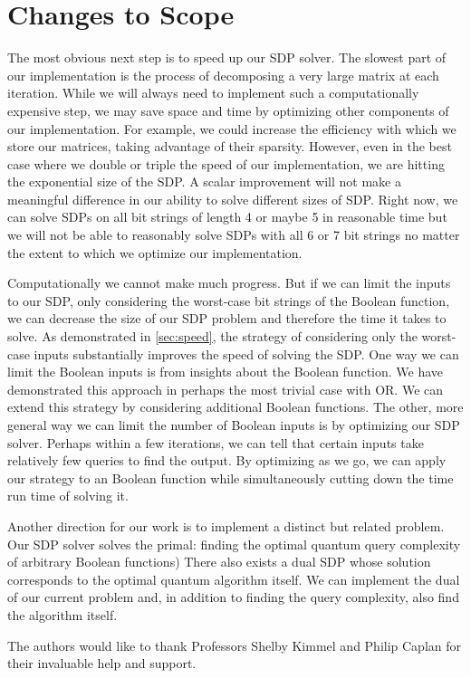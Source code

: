 \section{Changes to Scope}

The most obvious next step is to
speed up our SDP solver.
The slowest part of our implementation is the
process of decomposing a very large matrix at
each iteration.
While we will always need to implement
such a computationally expensive step,
we may save space and time by optimizing other 
components of our implementation.
For example, we could increase the efficiency with
which we store our matrices, taking advantage of
their sparsity. However, even in the best case where
we double or triple the speed of our implementation,
we are hitting the exponential size of the SDP.
A scalar improvement will not make a meaningful
difference in our ability to solve different sizes
of SDP.
Right now, we can solve SDPs on all bit strings
of length 4 or maybe 5 in reasonable time
but we will not be able to reasonably solve
SDPs with all 6 or 7 bit strings no matter the extent
to which we optimize our implementation.

Computationally we cannot make much progress.
But if we can limit the inputs to our SDP,
only considering the worst-case bit strings
of the Boolean function,
we can decrease the size of our SDP problem
and therefore the time it takes to solve.
As demonstrated in \cref{sec:speed}, 
the strategy of considering only the worst-case
inputs substantially improves the speed of solving the SDP.
One way we can limit the Boolean inputs is from
insights about the Boolean function.
We have demonstrated this approach in perhaps the most
trivial case with OR.
We can extend this strategy by considering additional
Boolean functions.
The other, more general way we can limit the number
of Boolean inputs is by optimizing our SDP solver.
Perhaps within a few iterations, we can tell
that certain inputs take relatively few queries to find
the output.
By optimizing as we go, we can apply our strategy to
an Boolean function while simultaneously cutting down
the time run time of solving it.

Another direction for our work is to implement
a distinct but related problem.
Our SDP solver solves the primal:
finding the optimal quantum query complexity
of arbitrary Boolean functions)
There also exists a dual SDP whose solution 
corresponds to the optimal quantum algorithm itself.
We can implement the dual of our current problem
and, in addition to finding the query complexity,
also find the algorithm itself.



\begin{acks}
The authors would like to thank Professors Shelby Kimmel
and Philip Caplan for their invaluable help and support. 
\end{acks}